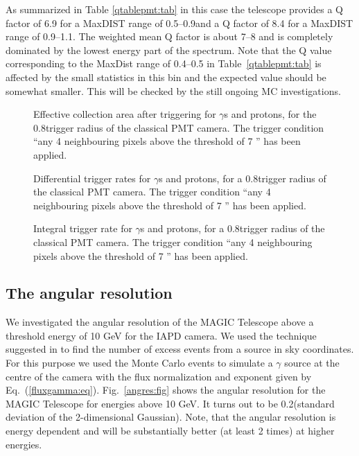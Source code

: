 As summarized in Table \ref{qtablepmt:tab} in this case the
telescope provides a Q factor of 6.9 for a MaxDIST range of
0.5\tdeg--0.9\tdeg and a Q factor of 8.4 for a MaxDIST range of
0.9\tdeg--1.1\tdeg. The weighted mean Q factor is about 7--8 and
is completely dominated by
the lowest energy part of the spectrum. 
Note that the Q value corresponding to the MaxDist range of 0.4\tdeg--0.5\tdeg
in Table~\ref{qtablepmt:tab} is affected by the small statistics
in this bin and the expected value should be somewhat smaller.
This will be checked by the still ongoing
MC investigations.
\begin{figure}[h]
 \begin{center}
  \caption{Effective collection area after triggering for $\gamma$s and
protons, for the 0.8\tdeg trigger radius of the classical PMT camera.  The
trigger condition ``any 4 neighbouring pixels above the threshold of 7
\phes'' has been applied.}
  \label{careapmt:fig}
 \end{center}
\end{figure}
\begin{figure}[h]
 \begin{center}
  \caption{Differential trigger rates for $\gamma$s and protons,
for a 0.8\tdeg trigger radius of the classical
PMT camera. The trigger condition ``any 4 neighbouring pixels
above the threshold of 7 \phes'' has been applied.}
  \label{dratepmt:fig}
 \end{center}
\end{figure}
\begin{figure}[h]
 \begin{center}
  \caption{Integral trigger rate for $\gamma$s and protons,
for a 0.8\tdeg trigger
radius of the classical PMT camera. The trigger condition
``any 4 neighbouring pixels above the threshold of 7 \phes''
has been applied.}
  \label{iratepmt:fig}
 \end{center}
\end{figure}


\subsection{The angular resolution}

\medskip We investigated the angular resolution of the MAGIC Telescope above a
threshold energy of 10 GeV for the IAPD camera. We used the technique
suggested in
\cite{akerlof:91} to find the number of excess events from
a source in sky coordinates. For this purpose we used the Monte Carlo
events to simulate a $\gamma$ source at the  centre of the camera 
with the flux
normalization and exponent given by Eq.~(\ref{fluxgamma:eq}).  
Fig.~\ref{angres:fig} shows the angular resolution for the MAGIC
Telescope for energies above 10 GeV. It turns out to be 0.2\tdeg (standard
deviation of the 2-dimensional Gaussian).
Note, that the angular resolution is energy dependent and will be
substantially better (at least 2 times) at higher energies.

